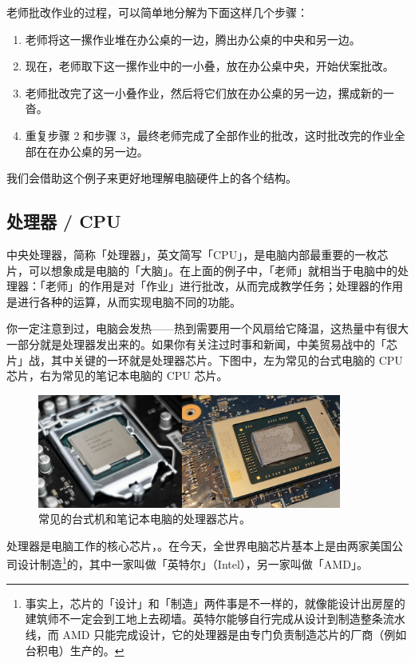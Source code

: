 老师批改作业的过程，可以简单地分解为下面这样几个步骤：

\begin{enumerate}
  \item 老师将这一摞作业堆在办公桌的一边，腾出办公桌的中央和另一边。
  \item 现在，老师取下这一摞作业中的一小叠，放在办公桌中央，开始伏案批改。
  \item 老师批改完了这一小叠作业，然后将它们放在办公桌的另一边，摞成新的一沓。
  \item 重复步骤 2 和步骤 3，最终老师完成了全部作业的批改，这时批改完的作业全部在在办公桌的另一边。
\end{enumerate}

我们会借助这个例子来更好地理解电脑硬件上的各个结构。

\subsection{处理器 / CPU}

中央处理器，简称「处理器」，英文简写「CPU」，是电脑内部最重要的一枚芯片，可以想象成是电脑的「大脑」。在上面的例子中，「老师」就相当于电脑中的处理器：「老师」的作用是对「作业」进行批改，从而完成教学任务；处理器的作用是进行各种的运算，从而实现电脑不同的功能。

你一定注意到过，电脑会发热——热到需要用一个风扇给它降温，这热量中有很大一部分就是处理器发出来的。如果你有关注过时事和新闻，中美贸易战中的「芯片」战，其中关键的一环就是处理器芯片。下图中，左为常见的台式电脑的 CPU 芯片，右为常见的笔记本电脑的 CPU 芯片。

\begin{figure}[H]
  \centering
  \includegraphics[width=10cm]{assets/CPUs.png}
  \caption{常见的台式机和笔记本电脑的处理器芯片。}
  \label{cpus}
\end{figure}

处理器是电脑工作的核心芯片，。在今天，全世界电脑芯片基本上是由两家美国公司设计制造\footnote{事实上，芯片的「设计」和「制造」两件事是不一样的，就像能设计出房屋的建筑师不一定会到工地上去砌墙。英特尔能够自行完成从设计到制造整条流水线，而 AMD 只能完成设计，它的处理器是由专门负责制造芯片的厂商（例如台积电）生产的。}的，其中一家叫做「英特尔」（Intel），另一家叫做「AMD」。

